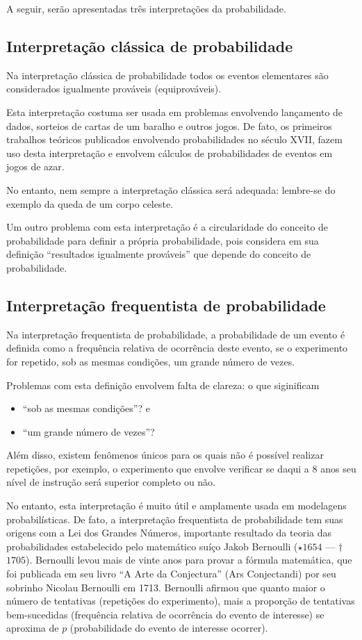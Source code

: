 A seguir, serão apresentadas três interpretações da probabilidade.


\subsection{Interpretação clássica de probabilidade}

Na interpretação clássica de probabilidade todos os eventos elementares são considerados igualmente prováveis (equiprováveis).

Esta interpretação costuma ser usada em problemas envolvendo lançamento de dados, sorteios de cartas de um baralho e outros jogos. De fato, os primeiros trabalhos teóricos publicados envolvendo probabilidades no século XVII, fazem uso desta interpretação e envolvem cálculos de probabilidades de eventos em jogos de azar.

No entanto, nem sempre a interpretação clássica será adequada: lembre-se do exemplo da queda de um corpo celeste.

Um outro problema com esta interpretação é a circularidade do conceito de probabilidade para definir a própria probabilidade, pois considera em sua definição “resultados igualmente prováveis”{} que depende do conceito de probabilidade.

\subsection{Interpretação frequentista de probabilidade}

Na interpretação frequentista de probabilidade, a probabilidade de um evento é definida como a frequência relativa de ocorrência deste evento, se o experimento for repetido, sob as mesmas condições, um grande número de vezes.

Problemas com esta definição envolvem falta de clareza: o que siginificam
\begin{itemize}
\item {} 
“sob as mesmas condições”? e

\item {} 
“um grande número de vezes”?

\end{itemize}

Além disso, existem fenômenos únicos para os quais não é possível realizar repetições, por exemplo, o experimento que envolve verificar se daqui a 8 anos seu nível de instrução será superior completo ou não.

No entanto, esta interpretação é muito útil e amplamente usada em modelagens probabilísticas. De fato, a interpretação frequentista de probabilidade tem suas origens com a Lei dos Grandes Números, importante resultado da teoria das probabilidades estabelecido pelo matemático suíço Jakob Bernoulli (\(\star\)\(1654\) — \(\dagger\)\(1705\)). Bernoulli levou mais de vinte anos para provar a fórmula matemática, que foi publicada em seu livro “A Arte da Conjectura”{} (Ars Conjectandi) por seu sobrinho Nicolau Bernoulli em 1713. Bernoulli afirmou que quanto maior o número de tentativas (repetições do experimento), mais a proporção de tentativas bem-sucedidas (frequência relativa de ocorrência do evento de interesse) se aproxima de \(p\) (probabilidade do evento de interesse ocorrer).

